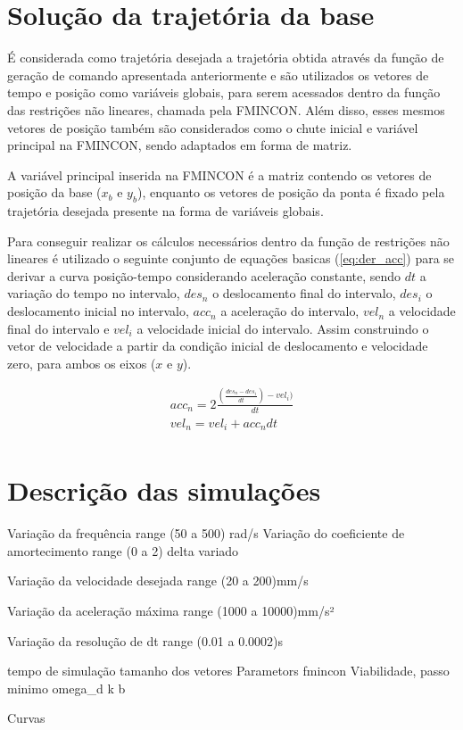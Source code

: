 \section{Solução da trajetória da base}

É considerada como trajetória desejada a trajetória obtida através da função de geração de comando apresentada anteriormente
e são utilizados os vetores de tempo e posição como variáveis globais, para serem acessados dentro da função das
restrições não lineares, chamada pela FMINCON.
Além disso, esses mesmos vetores de posição também são considerados como o chute inicial e variável principal
na FMINCON, sendo adaptados em forma de matriz.

A variável principal inserida na FMINCON é a matriz contendo os vetores de posição da base ($x_b$ e $y_b$),
enquanto os vetores de posição da ponta é fixado pela trajetória desejada presente na forma de variáveis globais.

Para conseguir realizar os cálculos necessários dentro da função de restrições não lineares é utilizado o seguinte conjunto
de equações basicas (\ref{eq:der_acc}) para se derivar a curva posição-tempo considerando aceleração constante,
sendo $dt$ a variação do tempo no intervalo, $des_n$ o deslocamento final do intervalo, $des_i$ o deslocamento inicial no intervalo,
$acc_n$ a aceleração do intervalo, $vel_n$ a velocidade final do intervalo e $vel_i$ a velocidade inicial do intervalo.
Assim construindo o vetor de velocidade a partir da condição inicial de deslocamento e velocidade zero, para ambos os eixos ($x$ e $y$).

\begin{equation}
    \label{eq:der_acc}
    \begin{split}        
        acc_n = 2\frac{(\frac{des_n-des_i}{dt})-vel_i)}{dt} \\
        vel_n = vel_i+acc_ndt \\
    \end{split}
\end{equation}

\section{Descrição das simulações}

Variação da frequência
range (50 a 500) rad/s
Variação do coeficiente de amortecimento
range (0 a 2) delta variado

Variação da velocidade desejada
range (20 a 200)mm/s

Variação da aceleração máxima
range (1000 a 10000)mm/s²

Variação da resolução de dt
range (0.01 a 0.0002)s


tempo de simulação
tamanho dos vetores
Parametors fmincon Viabilidade, passo minimo
omega_d
k
b

Curvas
